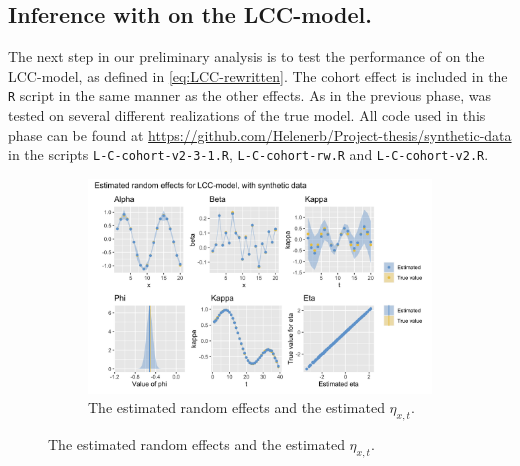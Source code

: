 \subsection{Inference with \inlabru on the LCC-model. }
The next step in our preliminary analysis is to test the performance of \inlabru on the LCC-model, as defined in \ref{eq:LCC-rewritten}. The cohort effect is included in the \texttt{R} script in the same manner as the other effects. As in the previous phase, \inlabru was tested on several different realizations of the true model. All code used in this phase can be found at \url{https://github.com/Helenerb/Project-thesis/synthetic-data} in the scripts \texttt{L-C-cohort-v2-3-1.R}, \texttt{L-C-cohort-rw.R} and \texttt{L-C-cohort-v2.R}.
\begin{figure}[h!]
    \centering
    \begin{subfigure}[b]{0.85\textwidth}
        \centering
        \includegraphics[width=\textwidth]{synthetic-data/Figures/effects-LCC-synthetic-3-1.png}
        \caption{The estimated random effects and the estimated $\eta_{x,t}$.}
    \end{subfigure}
    

\end{figure}
